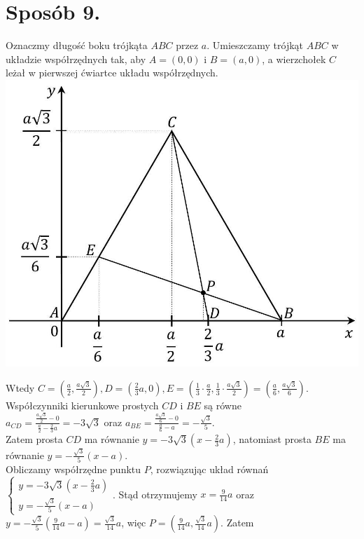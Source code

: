 \documentclass[10pt]{article}
\begin{document}
\section*{Sposób 9.}
Oznaczmy długość boku trójkąta $A B C$ przez $a$. Umieszczamy trójkąt $A B C$ w układzie współrzędnych tak, aby $A=(0,0)$ i $B=(a, 0)$, a wierzchołek $C$ leżał w pierwszej ćwiartce układu współrzędnych.\\
\includegraphics[max width=\textwidth, center]{2025_02_07_36131546116d12814c9cg-19}

Wtedy $C=\left(\frac{a}{2}, \frac{a \sqrt{3}}{2}\right), D=\left(\frac{2}{3} a, 0\right), E=\left(\frac{1}{3} \cdot \frac{a}{2}, \frac{1}{3} \cdot \frac{a \sqrt{3}}{2}\right)=\left(\frac{a}{6}, \frac{a \sqrt{3}}{6}\right)$.\\
Współczynniki kierunkowe prostych $C D$ i $B E$ są równe\\
$a_{C D}=\frac{\frac{a \sqrt{3}}{2}-0}{\frac{a}{2}-\frac{2}{3} a}=-3 \sqrt{3}$ oraz $a_{B E}=\frac{\frac{a \sqrt{3}}{6}-0}{\frac{a}{6}-a}=-\frac{\sqrt{3}}{5}$.\\
Zatem prosta $C D$ ma równanie $y=-3 \sqrt{3}\left(x-\frac{2}{3} a\right)$, natomiast prosta $B E$ ma równanie $y=-\frac{\sqrt{3}}{5}(x-a)$.\\
Obliczamy współrzędne punktu $P$, rozwiązując układ równań $\left\{\begin{array}{l}y=-3 \sqrt{3}\left(x-\frac{2}{3} a\right) \\ y=-\frac{\sqrt{3}}{5}(x-a)\end{array}\right.$. Stąd otrzymujemy $x=\frac{9}{14} a$ oraz $y=-\frac{\sqrt{3}}{5}\left(\frac{9}{14} a-a\right)=\frac{\sqrt{3}}{14} a$, więc $P=\left(\frac{9}{14} a, \frac{\sqrt{3}}{14} a\right)$. Zatem
\end{document}
